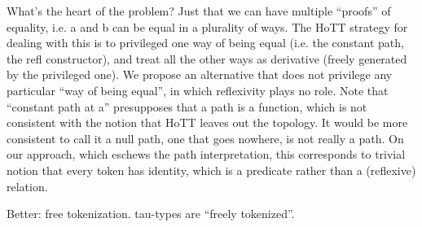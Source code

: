 \documentclass{article}
\begin{document}
What's the heart of the problem?  Just that we can have multiple
``proofs'' of equality, i.e. a and b can be equal in a plurality of
ways.  The HoTT strategy for dealing with this is to privileged one
way of being equal (i.e. the constant path, the refl constructor), and
treat all the other ways as derivative (freely generated by the
privileged one).  We propose an alternative that does not privilege
any particular ``way of being equal'', in which reflexivity plays no
role.  Note that ``constant path at a'' presupposes that a path is a
function, which is not consistent with the notion that HoTT leaves out
the topology.  It would be more consistent to call it a null path, one
that goes nowhere, is not really a path.  On our approach, which
eschews the path interpretation, this corresponds to trivial notion
that every token has identity, which is a predicate rather than a
(reflexive) relation.

Better: free tokenization.  tau-types are ``freely tokenized''.
\end{document}
